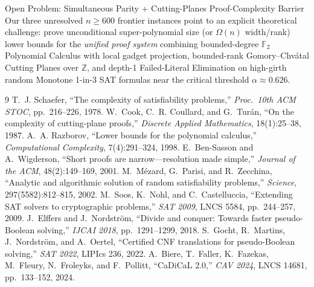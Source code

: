 \documentclass[11pt]{article}
\begin{document}
\begin{openproblembox}{Open Problem: Simultaneous Parity + Cutting-Planes Proof-Complexity Barrier}
Our three unresolved $n \ge 600$ frontier instances point to an explicit theoretical challenge: prove unconditional super-polynomial size (or $\Omega(n)$ width/rank) lower bounds for the \emph{unified proof system} combining bounded-degree $\mathbb{F}_2$ Polynomial Calculus with local gadget projection, bounded-rank Gomory--Chv\'atal Cutting Planes over $\mathbb{Z}$, and depth-1 Failed-Literal Elimination on high-girth random Monotone 1-in-3 SAT formulas near the critical threshold $\alpha \approx 0.626$.
\end{openproblembox}

\begin{thebibliography}{9}
\small
{} T.~J. Schaefer, ``The complexity of satisfiability problems,'' \emph{Proc.\ 10th ACM STOC}, pp.~216--226, 1978.
 W.~Cook, C.~R. Coullard, and G.~Tur\'an, ``On the complexity of cutting-plane proofs,'' \emph{Discrete Applied Mathematics}, 18(1):25--38, 1987.
 A.~A. Razborov, ``Lower bounds for the polynomial calculus,'' \emph{Computational Complexity}, 7(4):291--324, 1998.
 E.~Ben-Sasson and A.~Wigderson, ``Short proofs are narrow---resolution made simple,'' \emph{Journal of the ACM}, 48(2):149--169, 2001.
 M.~M\'ezard, G.~Parisi, and R.~Zecchina, ``Analytic and algorithmic solution of random satisfiability problems,'' \emph{Science}, 297(5582):812--815, 2002.
 M.~Soos, K.~Nohl, and C.~Castelluccia, ``Extending SAT solvers to cryptographic problems,'' \emph{SAT 2009}, LNCS 5584, pp.~244--257, 2009.
 J.~Elffers and J.~Nordstr\"om, ``Divide and conquer: Towards faster pseudo-Boolean solving,'' \emph{IJCAI 2018}, pp.~1291--1299, 2018.
 S.~Gocht, R.~Martins, J.~Nordstr\"om, and A.~Oertel, ``Certified CNF translations for pseudo-Boolean solving,'' \emph{SAT 2022}, LIPIcs 236, 2022.
 A.~Biere, T.~Faller, K.~Fazekas, M.~Fleury, N.~Froleyks, and F.~Pollitt, ``CaDiCaL 2.0,'' \emph{CAV 2024}, LNCS 14681, pp.~133--152, 2024.
\end{thebibliography}
\end{document}
